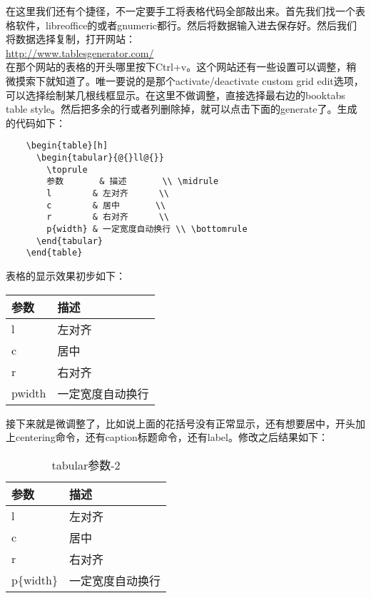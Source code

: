 \documentclass[11pt,oneside]{book}
\begin{document}
  在这里我们还有个捷径，不一定要手工将表格代码全部敲出来。首先我们找一个表格软件，libreoffice的或者gnumeric都行。然后将数据输入进去保存好。然后我们将数据选择复制，打开网站：\\ \href{http://www.tablesgenerator.com/}{http://www.tablesgenerator.com/}\\在那个网站的表格的开头哪里按下Ctrl+v。这个网站还有一些设置可以调整，稍微摸索下就知道了。唯一要说的是那个activate/deactivate custom grid edit选项，可以选择绘制某几根线框显示。在这里不做调整，直接选择最右边的booktabs table style。然后把多余的行或者列删除掉，就可以点击下面的generate了。生成的代码如下：
  \begin{Verbatim}
    \begin{table}[h]
      \begin{tabular}{@{}ll@{}}
        \toprule
        参数       & 描述       \\ \midrule
        l        & 左对齐      \\
        c        & 居中       \\
        r        & 右对齐      \\
        p{width} & 一定宽度自动换行 \\ \bottomrule
      \end{tabular}
    \end{table}
  \end{Verbatim}
  表格的显示效果初步如下：
  \begin{table}[H]
    \begin{tabular}{@{}ll@{}}
      \toprule
      参数       & 描述       \\ \midrule
      l        & 左对齐      \\
      c        & 居中       \\
      r        & 右对齐      \\
      p{width} & 一定宽度自动换行 \\ \bottomrule
    \end{tabular}
  \end{table}

  接下来就是微调整了，比如说上面的花括号没有正常显示，还有想要居中，开头加上centering命令，还有caption标题命令，还有label。修改之后结果如下：
  \begin{table}[H]
    \centering
    \begin{tabular}{@{}ll@{}}
      \toprule[1.2pt]
      参数       & 描述       \\ \midrule
      l        & 左对齐      \\
      c        & 居中       \\
      r        & 右对齐      \\
      p\{width\} & 一定宽度自动换行 \\ \bottomrule[1.2pt]
    \end{tabular}
    \caption{tabular参数-2}
    \label{tab:tabular参数-2}
  \end{table}
\end{document}
